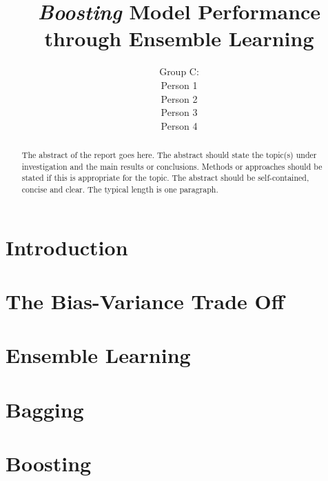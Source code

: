 \documentclass{SMLreport}
\title{\textit{Boosting} Model Performance through Ensemble Learning}
\author{Group C: \\ Person 1 \\ Person 2 \\ Person 3 \\ Person 4}
\begin{document}
\maketitle

\begin{abstract}
The abstract of the report goes here. The abstract should state the
topic(s) under investigation and the main results or
conclusions. Methods or approaches should be stated if this is
appropriate for the topic. The abstract should be self-contained,
concise and clear. The typical length is one paragraph.
\end{abstract}

\setcounter{tocdepth}{2}  %
\tableofcontents 
\newpage

\section{Introduction} \label{sec:intro}

\section{The Bias-Variance Trade Off} \label{sec:bias-variance}

\section{Ensemble Learning} \label{sec:ensemble}

\section{Bagging} \label{sec:bagging}

\section{Boosting} \label{sec:boost}


\newpage
\end{document}
